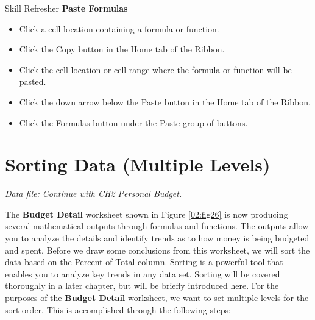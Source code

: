 \begin{center}
	\begin{sklbox}{Skill Refresher}
		\textbf{Paste Formulas}
		\\
		\begin{itemize}
			\setlength{\itemsep}{0pt}
			\setlength{\parskip}{0pt}
			\setlength{\parsep}{0pt}
			
			\item Click a cell location containing a formula or function.
			\item Click the Copy button in the Home tab of the Ribbon.
			\item Click the cell location or cell range where the formula or function will be pasted.
			\item Click the down arrow below the Paste button in the Home tab of the Ribbon.
			\item Click the Formulas button under the Paste group of buttons.
			
		\end{itemize}
	\end{sklbox}
\end{center}

\section{Sorting Data (Multiple Levels)}

\textit{Data file: Continue with CH2 Personal Budget.}

The \textbf{Budget Detail} worksheet shown in Figure \ref{02:fig26} is now producing several mathematical outputs through formulas and functions. The outputs allow you to analyze the details and identify trends as to how money is being budgeted and spent. Before we draw some conclusions from this worksheet, we will sort the data based on the Percent of Total column. Sorting is a powerful tool that enables you to analyze key trends in any data set. Sorting will be covered thoroughly in a later chapter, but will be briefly introduced here. For the purposes of the \textbf{Budget Detail} worksheet, we want to set multiple levels for the sort order. This is accomplished through the following steps:

